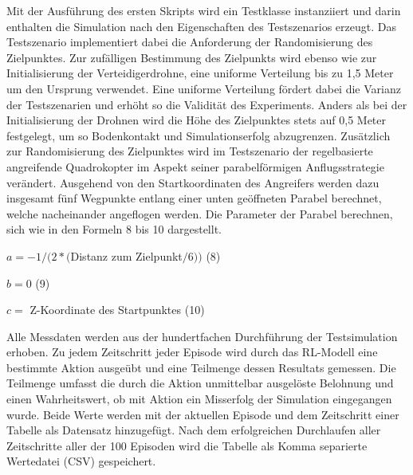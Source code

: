 Mit der Ausführung des ersten Skripts wird ein Testklasse instanziiert und darin enthalten die Simulation nach den Eigenschaften des Testszenarios erzeugt.
Das Testszenario implementiert dabei die Anforderung der Randomisierung des Zielpunktes.
Zur zufälligen Bestimmung des Zielpunkts wird ebenso wie zur Initialisierung der Verteidigerdrohne, eine uniforme Verteilung bis zu 1,5 Meter um den Ursprung verwendet.
Eine uniforme Verteilung fördert dabei die Varianz der Testszenarien und erhöht so die Validität des Experiments.
Anders als bei der Initialisierung der Drohnen wird die Höhe des Zielpunktes stets auf 0,5 Meter festgelegt, um so Bodenkontakt und Simulationserfolg abzugrenzen.
Zusätzlich zur Randomisierung des Zielpunktes wird im Testszenario der regelbasierte angreifende Quadrokopter im Aspekt seiner parabelförmigen Anflugsstrategie verändert.
Ausgehend von den Startkoordinaten des Angreifers werden dazu insgesamt fünf Wegpunkte entlang einer unten geöffneten Parabel berechnet, welche nacheinander angeflogen werden.
Die Parameter der Parabel berechnen, sich wie in den Formeln 8 bis 10 dargestellt.

\begin{description}
    \item \begin{center} $ a = -1 / (2 * ($Distanz zum Zielpunkt$ / 6))$ (8)\end{center}
    \item \begin{center} $ b = 0$ (9)\end{center}
    \item \begin{center} $ c = $ Z-Koordinate des Startpunktes (10)\end{center}
\end{description}

Alle Messdaten werden aus der hundertfachen Durchführung der Testsimulation erhoben.
Zu jedem Zeitschritt jeder Episode wird durch das RL-Modell eine bestimmte Aktion ausgeübt und eine Teilmenge dessen Resultats gemessen.
Die Teilmenge umfasst die durch die Aktion unmittelbar ausgelöste Belohnung und einen Wahrheitswert, ob mit Aktion ein Misserfolg der Simulation eingegangen wurde.
Beide Werte werden mit der aktuellen Episode und dem Zeitschritt einer Tabelle als Datensatz hinzugefügt.
Nach dem erfolgreichen Durchlaufen aller Zeitschritte aller der 100 Episoden wird die Tabelle als Komma separierte Wertedatei (CSV) gespeichert.

